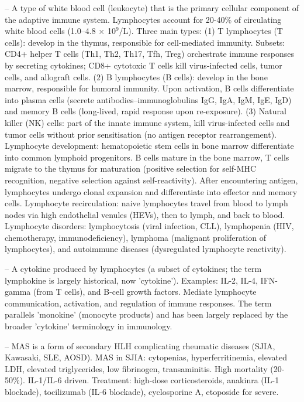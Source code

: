 -- A type of white blood cell (leukocyte) that is the primary cellular component of the adaptive immune system. Lymphocytes account for 20-40\% of circulating white blood cells (1.0--4.8 $\times$ 10$^9$/L). Three main types: (1) T lymphocytes (T cells): develop in the thymus, responsible for cell-mediated immunity. Subsets: CD4+ helper T cells (Th1, Th2, Th17, Tfh, Treg) orchestrate immune responses by secreting cytokines; CD8+ cytotoxic T cells kill virus-infected cells, tumor cells, and allograft cells. (2) B lymphocytes (B cells): develop in the bone marrow, responsible for humoral immunity. Upon activation, B cells differentiate into plasma cells (secrete antibodies--immunoglobulins IgG, IgA, IgM, IgE, IgD) and memory B cells (long-lived, rapid response upon re-exposure). (3) Natural killer (NK) cells: part of the innate immune system, kill virus-infected cells and tumor cells without prior sensitisation (no antigen receptor rearrangement). Lymphocyte development: hematopoietic stem cells in bone marrow differentiate into common lymphoid progenitors. B cells mature in the bone marrow, T cells migrate to the thymus for maturation (positive selection for self-MHC recognition, negative selection against self-reactivity). After encountering antigen, lymphocytes undergo clonal expansion and differentiate into effector and memory cells. Lymphocyte recirculation: naive lymphocytes travel from blood to lymph nodes via high endothelial venules (HEVs), then to lymph, and back to blood. Lymphocyte disorders: lymphocytosis (viral infection, CLL), lymphopenia (HIV, chemotherapy, immunodeficiency), lymphoma (malignant proliferation of lymphocytes), and autoimmune diseases (dysregulated lymphocyte reactivity).

-- A cytokine produced by lymphocytes (a subset of cytokines; the term lymphokine is largely historical, now 'cytokine'). Examples: IL-2, IL-4, IFN-gamma (from T cells), and B-cell growth factors. Mediate lymphocyte communication, activation, and regulation of immune responses. The term parallels 'monokine' (monocyte products) and has been largely replaced by the broader 'cytokine' terminology in immunology.

-- MAS is a form of secondary HLH complicating rheumatic diseases (SJIA, Kawasaki, SLE, AOSD). MAS in SJIA: cytopenias, hyperferritinemia, elevated LDH, elevated triglycerides, low fibrinogen, transaminitis. High mortality (20-50\%). IL-1/IL-6 driven. Treatment: high-dose corticosteroids, anakinra (IL-1 blockade), tocilizumab (IL-6 blockade), cyclosporine A, etoposide for severe.


